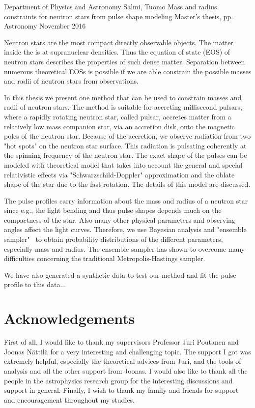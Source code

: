 \documentclass{wihuri}
\begin{document}
\begin{tiivistelma}%
        {Department of Physics and Astronomy}%
        {Salmi, Tuomo}%
        {Mass and radius constraints for neutron stars
from pulse shape modeling}
        {Master's thesis, \pageref{LastPage} pp.}%
        {Astronomy}%
        {November 2016}%

	Neutron stars are the most compact directly observable objects. The matter inside the is at supranuclear densities. Thus the equation of state (EOS) of neutron stars describes the properties of such dense matter. Separation between numerous theoretical EOSs is possible if we are able constrain the possible masses and radii of neutron stars from observations.
	
In this thesis we present one method that can be used to constrain masses and radii of neutron stars. The method is suitable for accreting millisecond pulsars, where a rapidly rotating neutron star, called pulsar, accretes matter from a relatively low mass companion star, via an accretion disk, onto the magnetic poles of the neutron star. Because of the accretion, we observe radiation from two "hot spots" on the neutron star surface. This radiation is pulsating coherently at the spinning frequency of the neutron star. The exact shape of the pulses can be modeled with  theoretical model that takes into account the general and special relativistic effects via "Schwarzschild-Doppler" approximation and the oblate shape of the star due to the fast rotation. The details of this model are discussed. 
	
The pulse profiles carry information about the mass and radius of a neutron star since e.g., the light bending and thus pulse shapes depends much on the compactness of the star. Also many other physical parameters and observing angles affect the light curves. Therefore, we use Bayesian analysis and "ensemble sampler" \ to obtain probability distributions of the different parameters, especially mass and radius. The ensemble sampler has shown to overcome many difficulties concerning the traditional Metropolis-Hastings sampler. 

We have also generated a synthetic data to test our method and fit the pulse profile to this data...  

	
	
\end{tiivistelma}

\section*{Acknowledgements}
First of all, I would like to thank my supervisors Professor Juri Poutanen and Joonas Nättilä for a very interesting and challenging topic. The support I got was extremely helpful, especially the theoretical advices from Juri, and the tools of analysis and all the other support from Joonas. I would also like to thank all the people in the astrophysics research group for the interesting discussions and support in
general. Finally, I wish to thank my family and friends %
for support and encouragement throughout my studies.
 
\end{document}
